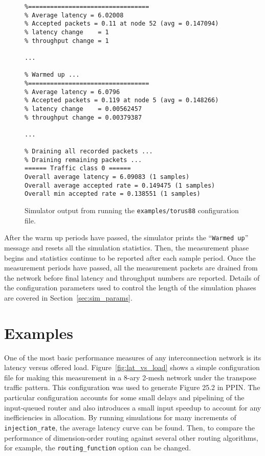 \documentclass[11pt]{article}
\begin{document}
\begin{figure}
\begin{verbatim}
%=================================
% Average latency = 6.02008
% Accepted packets = 0.11 at node 52 (avg = 0.147094)
% latency change    = 1
% throughput change = 1

...

% Warmed up ...
%=================================
% Average latency = 6.0796
% Accepted packets = 0.119 at node 5 (avg = 0.148266)
% latency change    = 0.00562457
% throughput change = 0.00379387

...

% Draining all recorded packets ...
% Draining remaining packets ...
====== Traffic class 0 ======
Overall average latency = 6.09083 (1 samples)
Overall average accepted rate = 0.149475 (1 samples)
Overall min accepted rate = 0.138551 (1 samples)
\end{verbatim}
\caption{Simulator output from running the \texttt{examples/torus88}
configuration file.}
\label{fig:sim_output}
\end{figure}

After the warm up periods have passed, the simulator prints the
``\texttt{Warmed up}'' message and resets all the simulation statistics.
Then, the measurement phase begins and statistics continue to be
reported after each sample period.  Once the measurement periods have
passed, all the measurement packets are drained from the network
before final latency and throughput numbers are reported.  Details of
the configuration parameters used to control the length of the
simulation phases are covered in Section~\ref{sec:sim_params}.

\section{Examples}
\label{sec:examples}

One of the most basic performance measures of any interconnection
network is its latency versus offered load.
Figure~\ref{fig:lat_vs_load} shows a simple configuration file for
making this measurement in a 8-ary 2-mesh network under the transpose
traffic pattern.  This configuration was used to generate Figure 25.2
in PPIN.  The particular configuration accounts for some small delays
and pipelining of the input-queued router and also introduces a small
input speedup to account for any inefficiencies in allocation.  By
running simulations for many increments of \texttt{injection\_rate},
the average latency curve can be found.  Then, to compare the
performance of dimension-order routing against several other routing
algorithms, for example, the \texttt{routing\_function} option can be
changed.
\end{document}
